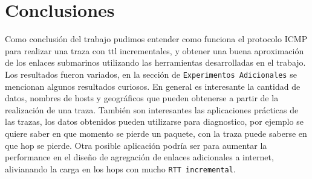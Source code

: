 \section{Conclusiones}
Como conclusión del trabajo pudimos entender como funciona el protocolo ICMP para realizar una traza con ttl incrementales, y obtener una buena aproximación de los enlaces submarinos utilizando las herramientas desarrolladas en el trabajo. Los resultados fueron variados, en la sección de \texttt{Experimentos Adicionales} se mencionan algunos resultados curiosos. En general es interesante la cantidad de datos, nombres de hosts y geográficos que pueden obtenerse a partir de la realización de una traza. También son interesantes las aplicaciones prácticas de las trazas, los datos obtenidos pueden utilizarse para diagnostico, por ejemplo se quiere saber en que momento se pierde un paquete, con la traza puede saberse en que hop se pierde. Otra posible aplicación podr\'ia ser para aumentar la performance en el diseño de agregación de enlaces adicionales a internet, alivianando la carga en los hops con mucho \texttt{RTT incremental}.
